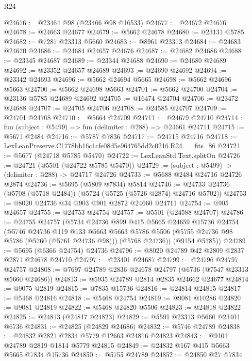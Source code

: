 \begin{lexlean}{R24}
\begin{coremodule}
@24676 := @23464 @98 (@23466 @98 @16533)
@24677 := @24672 @24676
@24678 := @24663 @24677
@24679 := @5662 @24678
@24680 := @23131 @5785
@24682 := @7287 @23313 @5660
@24683 := @8961 @23313
@24684 := @24683 @24670
@24686 := @24684 @24657 @24676
@24687 := @24682 @24686
@24688 := @23345 @24687
@24689 := @23344 @24688
@24690 := @24680 @24689
@24692 := @23352 @24657 @24689
@24693 := @24690 @24692
@24694 := @23342 @24693
@24696 := @5662 @24694 @5665
@24698 := @5662 @24696 @5663
@24700 := @5662 @24698 @5663
@24701 := @5662 @24700
@24704 := @23136 @5785 @24689 @24692
@24705 := @16474 @24704
@24706 := @23472 @24688
@24707 := @24705 @24706
@24708 := @24585 @24707
@24709 := @24701 @24708
@24710 := @5664 @24709
@24711 := @24679 @24710
@24714 := fun (subject : @5499) => fun (delimiter : @288) => @24661 @24711
@24715 := @5671 @2484
@24716 := @5787 @7836
@24717 := @24715 @24716
@24718 := LexLeanPreserve.C1778bb16c1cfe08d5e964765dd2c0216.R24.__fits_86
@24721 := @5677 (@24718 @5785 @5470)
@24722 := LexLeanStd.Text.splitOn
@24726 := @24721 (@5501 (@24722 @5785 @5470))
@24729 := (subject : @5499) -> (delimiter : @288) -> @24717 @24726
@24733 := @5688 @2484 @24716 @24726 @2874
@24736 := @5695 (@5809 @7834) @5814
@24746 := @24733 @24736 (@5708 (@5718 @2484)) (@5724 (@5725 (@5726 @2874) @24716 @5702))
@24753 := @8020 @24736 @34 @903 @901 @2872 @24660 @24711
@24754 := @905 @24657
@24755 := @24753 @24754
@24757 := @5501 (@24588 @24707)
@24786 := @24755
    @24757
    (@5734
      @24736
      @899
      @415
      @5665
      @24659
      @15736
      @24754
      (@5746
        @24736
        @119
        @133
        @5663
        @5663
        @5786
        @5506
        (@5755 @24736 @98 @5786 (@5760 (@5761 @24736 @98)))
        (@5768 @24736))
      (@9154 @5785))
@24789 := @5695 (@6366 @24754) @24736
@24796 := @8020 @24789 @42 @2809 @2837 @2871 @24678 @24710
@24797 := @23401 @24687
@24799 := @24796 @24797 @24757
@24808 := @7697 @24789 @2836 @24678 @24797 (@6736 (@7547 @23313 @5660 @24686))
@24813 := @5935 @24789 @2814 @2835 @24662 @24677
@24814 := @9075 @2819
@24815 := @7835 @15736
@24816 := @24814 @24815
@24817 := @5468 @24816
@24818 := @5468 @24754
@24819 := @9081 @10286
@24820 := @9081 @24819
@24822 := @5468 @24820 @5506
@24823 := @24818 @24822
@24825 := @24813 (@24817 @24823)
@24829 := @5591 @23313 @5660 @23401 @6736
@24831 := @24825 (@24829 @24686)
@24832 := @5746 @24789
@24838 := @24832 @2821 @2834 @5779 @12663 @24816 @24823
@24843 := @9101 @24789 @2819 @1814 @5779 @24815
@24849 := @24832 @167 @415 @5663 @5665 @7834 @15736
@24850 := @5755 @24789
@24852 := @24850 @27 @7834

\end{coremodule}
\end{lexlean}
